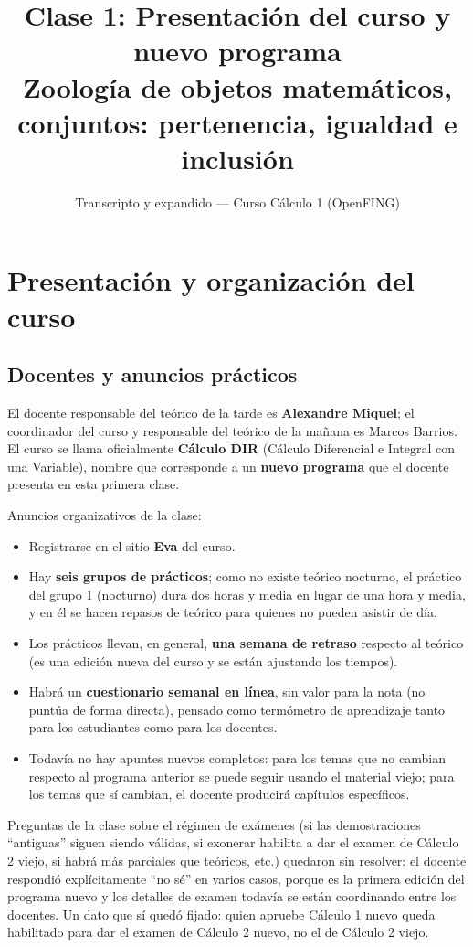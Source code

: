 \documentclass[12pt,a4paper]{article}
\title{\textbf{Clase 1: Presentación del curso y nuevo programa} \\[0.3em]
        \large{Zoología de objetos matemáticos, conjuntos: pertenencia, igualdad e inclusión}}
\author{Transcripto y expandido --- Curso Cálculo 1 (OpenFING)}
\date{}
\begin{document}
\maketitle
\thispagestyle{empty}
\newpage

\tableofcontents
\newpage

\section{Presentación y organización del curso}

\subsection{Docentes y anuncios prácticos}

El docente responsable del teórico de la tarde es \textbf{Alexandre Miquel};
el coordinador del curso y responsable del teórico de la mañana es Marcos
Barrios. El curso se llama oficialmente \textbf{Cálculo DIR} (Cálculo
Diferencial e Integral con una Variable), nombre que corresponde a un
\textbf{nuevo programa} que el docente presenta en esta primera clase.

Anuncios organizativos de la clase:

\begin{itemize}
  \item Registrarse en el sitio \textbf{Eva} del curso.
  \item Hay \textbf{seis grupos de prácticos}; como no existe teórico
    nocturno, el práctico del grupo 1 (nocturno) dura dos horas y media en
    lugar de una hora y media, y en él se hacen repasos de teórico para
    quienes no pueden asistir de día.
  \item Los prácticos llevan, en general, \textbf{una semana de retraso}
    respecto al teórico (es una edición nueva del curso y se están
    ajustando los tiempos).
  \item Habrá un \textbf{cuestionario semanal en línea}, sin valor para la
    nota (no puntúa de forma directa), pensado como termómetro de
    aprendizaje tanto para los estudiantes como para los docentes.
  \item Todavía no hay apuntes nuevos completos: para los temas que no
    cambian respecto al programa anterior se puede seguir usando el
    material viejo; para los temas que sí cambian, el docente producirá
    capítulos específicos.
\end{itemize}

\begin{notebox}
Preguntas de la clase sobre el régimen de exámenes (si las demostraciones
``antiguas'' siguen siendo válidas, si exonerar habilita a dar el examen de
Cálculo 2 viejo, si habrá más parciales que teóricos, etc.) quedaron sin
resolver: el docente respondió explícitamente ``no sé'' en varios casos,
porque es la primera edición del programa nuevo y los detalles de examen
todavía se están coordinando entre los docentes. Un dato que sí quedó
fijado: quien apruebe Cálculo 1 nuevo queda habilitado para dar el examen de
Cálculo 2 nuevo, no el de Cálculo 2 viejo.
\end{notebox}
\end{document}
